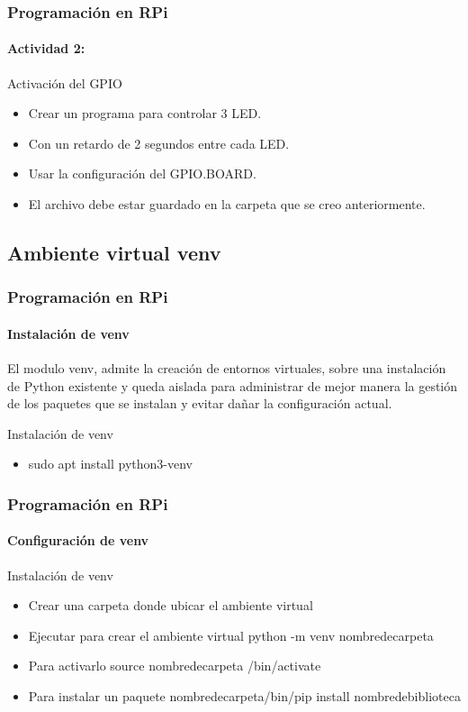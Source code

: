 \documentclass{beamer}
\begin{document}
	\begin{frame}
		\frametitle{Programación en RPi}
		\framesubtitle{Actividad 2:}
		\begin{mybox}{Activación del GPIO}
			\begin{itemize}
				\item Crear un programa para controlar 3 LED.
				\item Con un retardo de 2 segundos entre cada LED.
				\item Usar la configuración del GPIO.BOARD.
				\item El archivo debe estar guardado en la carpeta que se creo anteriormente.
			\end{itemize}
		\end{mybox}
	\end{frame}
\subsection{Ambiente virtual venv}	
	\begin{frame}
		\frametitle{Programación en RPi}
		\framesubtitle{Instalación de venv}
		El modulo venv, admite la creación de entornos virtuales, sobre una instalación de Python existente y queda aislada para administrar de mejor manera la gestión de los paquetes que se instalan y evitar dañar la configuración actual. 
		\begin{mybox}{Instalación de venv}
			\begin{itemize}
				\item sudo apt install python3-venv
			\end{itemize}	
		\end{mybox}	
	\end{frame}
	
	\begin{frame}
		\frametitle{Programación en RPi}
		\framesubtitle{Configuración de venv}
		\begin{mybox}{Instalación de venv}
			\begin{itemize}
				\item Crear una carpeta donde ubicar el ambiente virtual
				\item Ejecutar para crear el ambiente virtual python -m venv nombredecarpeta
				\item Para activarlo source nombredecarpeta /bin/activate
				\item Para instalar un paquete nombredecarpeta/bin/pip install nombredebiblioteca
			\end{itemize}
		\end{mybox}	
	\end{frame}
	
\end{document}
